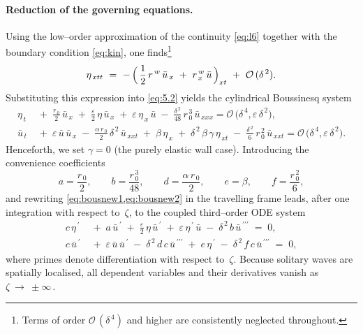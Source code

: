 \documentclass[alpha-refs, 12pt]{wiley-article}
\renewcommand{\O}{\mathcal{O}}
\newcommand{\eps}{\varepsilon}
\begin{document}
\paragraph{Reduction of the governing equations.} Using the low–order approximation of the continuity \cref{eq:l6} together with the boundary condition \eqref{eq:kin}, one finds\footnote{Terms of order $\O\,(\delta^{\,4})$ and higher are consistently neglected throughout.}
\begin{equation*}
  \eta_{\,x t t}\ =\ -\,\Bigl(\,\frac{1}{2}\,r^{\,w}\,\bar{u}_{\,x}\ +\ r^{\,w}_{\,x}\,\bar{u}\,\Bigr)_{x t}\ +\ \O\,(\delta^{\,2}).
\end{equation*}
Substituting this expression into \cref{eq:5.2} yields the cylindrical Boussinesq system
\begin{align}
  \eta_{\,t}
  &\;+\; \frac{r_{\,0}}{2}\,\bar{u}_{\,x}
       \;+\;\frac{\eps}{2}\,\eta\,\bar{u}_{\,x}
       \;+\;\eps\,\eta_{\,x}\,\bar{u}
       \;-\;\frac{\delta^{\,2}}{48}\,r_{\,0}^{\,3}\,\bar{u}_{\,xxx}
       =\O\,\bigl(\delta^{\,4},\eps\,\delta^{\,2}\bigr), 
  \label{eq:bousnew1}\\
  \bar{u}_{\,t}
  &\;+\;\eps\,\bar{u}\,\bar{u}_{\,x}
       \;-\;\frac{\alpha\,r_{\,0}}{2}\,\delta^{\,2}\,\bar{u}_{\,xxt}
       \;+\;\beta\,\eta_{\,x}
       \;+\;\delta^{\,2}\,\beta\,\gamma\,\eta_{\,x t}
       \;-\;\frac{\delta^{\,2}}{6}\,r_{\,0}^{\,2}\,\bar{u}_{\,xxt}
       =\O\,\bigl(\delta^{\,4},\eps\,\delta^{\,2}\bigr).
  \label{eq:bousnew2}
\end{align}
Henceforth, we set $\gamma = 0$ (the purely elastic wall case). Introducing the convenience coefficients
\begin{equation*}
  a=\frac{r_{\,0}}{2}, \qquad  
  b=\frac{r_{\,0}^{\,3}}{48}, \qquad
  d=\frac{\alpha\,r_{\,0}}{2}, \qquad
  e=\beta, \qquad
  f=\frac{r_{\,0}^{\,2}}{6},
\end{equation*}
and rewriting \cref{eq:bousnew1,eq:bousnew2} in the travelling frame leads, after one integration with respect to~$\zeta$, to the coupled third–order ODE system
\begin{align}
  c\,\eta^{\,\prime}
  &\;+\;a\,\bar{u}^{\,\prime}
       \;+\;\frac{\eps}{2}\,\eta\,\bar{u}^{\,\prime}
       \;+\;\eps\,\eta^{\,\prime}\,\bar{u}
       \;-\;\delta^{\,2}\,b\,\bar{u}^{\,\prime\prime\prime}
       \;=\;0,
  \label{eq:5.9a} \\
  c\,\bar{u}^{\,\prime}
  &\;+\;\eps\,\bar{u}\,\bar{u}^{\,\prime}
       \;-\;\delta^{\,2}\,d\,c\,\bar{u}^{\,\prime\prime\prime}
       \;+\;e\,\eta^{\,\prime}
       \;-\;\delta^{\,2}\,f\,c\,\bar{u}^{\,\prime\prime\prime}
       \;=\;0,
  \label{eq:5.10a}
\end{align}
where primes denote differentiation with respect to~$\zeta$. Because solitary waves are spatially localised, all dependent variables and their derivatives vanish as $\zeta\ \to\ \pm\infty\,$.
\end{document}
